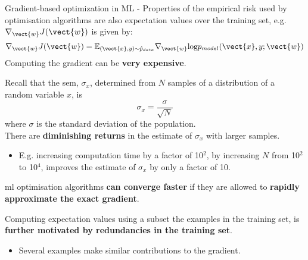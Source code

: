 \begin{frame}[t,allowframebreaks]{
    Gradient-based optimization in ML -}
    Properties of the \gls{empirical risk} used by 
    \gls{optimisation} algorithms are also 
    expectation values over the \gls{training set},
    e.g. $\nabla_{\vect{w}} J(\vect{w})$
    is given by:
    \begin{equation}
        \nabla_{\vect{w}} J(\vect{w}) = 
          \mathbb{E}_{(\vect{x},y){\sim}\hat{p}_{data}}
          \nabla_{\vect{w}} \text{log}p_{model}(\vect{x},y;\vect{w})
    \end{equation}
    Computing the \gls{gradient} can be {\bf very expensive}.\\

    \framebreak


    Recall that the \gls{sem}, $\sigma_{x}$, 
    determined from $N$ samples of a
    distribution of a random variable $x$, is
    \begin{equation}
        \sigma_{x} = \frac{\sigma}{\sqrt{N}}
        \label{eq:sem}
    \end{equation}    
    where $\sigma$ is the 
    \gls{standard deviation} of the population.\\
    \vspace{0.2cm}
    There are {\bf diminishing returns} in the estimate of 
    $\sigma_{x}$ with larger samples.
    \begin{itemize}
        \small
        \item
        E.g. increasing computation time by a factor of 10$^2$,
        by increasing $N$ from 10$^2$ to 10$^4$,
        improves the estimate of $\sigma_{x}$ by only a factor of 10.
    \end{itemize}
    \vspace{0.2cm}

    \gls{ml} \gls{optimisation} 
    algorithms {\bf can converge faster} if they are allowed to 
    {\bf rapidly approximate the exact \gls{gradient}}.\\
    \vspace{0.2cm}

    Computing expectation values using a subset the examples in the 
    \gls{training set}, is {\bf further motivated by 
    redundancies in the \gls{training set}}.\\
    \begin{itemize}
        \small
        \item
        Several examples make similar contributions to the \gls{gradient}.
    \end{itemize}


\end{frame}
